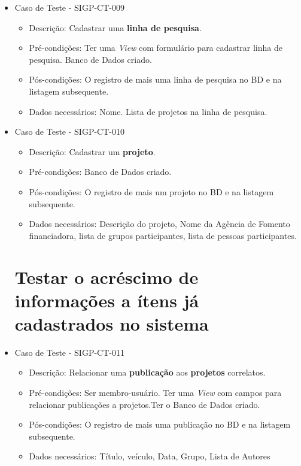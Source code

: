 \documentclass[11pt, a4paper]{book}
\begin{document}
\begin{itemize}
\newpage

	\item Caso de Teste - SIGP-CT-009
	\begin{itemize}
	\item Descrição: Cadastrar uma \textbf{linha de pesquisa}.
	\item Pré-condições: Ter uma \emph{View} com formulário para cadastrar linha de pesquisa. Banco de Dados criado.
	\item Pós-condições: O registro de mais uma linha de pesquisa no BD e na listagem subsequente.
	\item Dados necessários: Nome. Lista de projetos na linha de pesquisa.
	\end{itemize}

	\item Caso de Teste - SIGP-CT-010
	\begin{itemize}
	\item Descrição: Cadastrar um \textbf{projeto}.
	\item Pré-condições: Banco de Dados criado.
	\item Pós-condições: O registro de mais um projeto no BD e na listagem subsequente.
	\item Dados necessários: Descrição do projeto, Nome da Agência de Fomento financiadora, lista de grupos participantes, lista de pessoas participantes.
	\end{itemize}

\newpage
\section{Testar o acréscimo de informações a ítens já cadastrados no sistema}

	\item Caso de Teste - SIGP-CT-011
	\begin{itemize}
	\item Descrição: Relacionar uma \textbf{publicação} aos \textbf{projetos} correlatos.
	\item Pré-condições: Ser membro-usuário. Ter uma \emph{View} com campos para relacionar publicações a projetos.Ter o Banco de Dados criado.
	\item Pós-condições: O registro de mais uma publicação no BD e na listagem subsequente.
	\item Dados necessários: Título, veículo, Data, Grupo, Lista de Autores
	\end{itemize}


\end{itemize}
\end{document}
